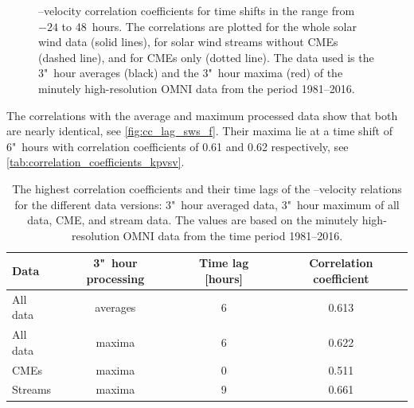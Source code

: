 \begin{figure}[htb]
\begin{floatrow}
{		}{
			\caption[I created the figure myself.]
			{\Kp{}--velocity correlation coefficients for time shifts in the range from $-24$ to 48~hours. The correlations are plotted for the whole solar wind data (solid lines), for solar wind streams without CMEs (dashed line), and for CMEs only (dotted line). The data used is the 3"~hour averages (black) and the 3"~hour maxima (red) of the minutely high-resolution OMNI data from the period 1981--2016.}
			\label{fig:cc_lag_sws_f}
		}
	\end{floatrow}
\end{figure}

The \Kp{} correlations with the average and maximum processed data show that both are nearly identical, see \autoref{fig:cc_lag_sws_f}. Their maxima lie at a time shift of 6"~hours with correlation coefficients of 0.61 and 0.62 respectively, see \autoref{tab:correlation_coefficients_kpvsv}.
\begin{table}[htb]
	\caption{The highest correlation coefficients and their time lags of the \Kp{}--velocity relations for the different data versions: 3"~hour averaged data, 3"~hour maximum of all data, CME, and stream data. The values are based on the minutely high-resolution OMNI data from the time period 1981--2016.}
	\label{tab:correlation_coefficients_kpvsv}
	\centering
	\begin{tabular}{lccc}
		\hline\hline
		Data	&3"~hour processing	&Time lag [hours]	&Correlation coefficient\\
		\hline
		All data	&averages	&6	&0.613\\
		All data	&maxima	&6	&0.622\\
		CMEs	&maxima	&0	&0.511\\
		Streams	&maxima	&9	&0.661\\
		\hline
	\end{tabular}
\end{table}
% 

